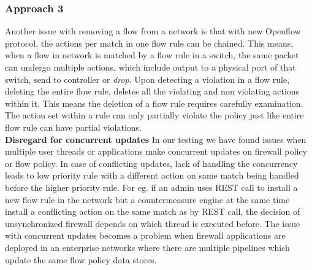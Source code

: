 \subsubsection{Approach 3}
Another issue with removing a flow from a network is that with new Openflow protocol, the actions per match in one flow rule can be chained. This means, when a flow in network is matched by a flow rule in a switch, the same packet can undergo multiple actions, which include output to a physical port of that switch, send to controller or \textit{drop}. Upon detecting a violation in a flow rule, deleting the entire flow rule, deletes all the violating and non violating actions within it. This means the deletion of a flow rule requires carefully examination. The action set within a rule can only partially violate the policy just like entire flow rule can have partial violations.\\
\textbf{Disregard for concurrent updates}
In our testing we have found issues when multiple user threads or applications make concurrent updates on firewall policy or flow policy. In case of conflicting updates, lack of handling the concurrency leads to low priority rule with a different action on same match being handled before the higher priority rule. For eg. if an admin uses REST call to install a new flow rule in the network but a countermeasure engine at the same time install a conflicting action on the same match as by REST call, the decision of unsynchronized firewall depends on which thread is executed before. The issue with concurrent updates becomes a problem when firewall applications are deployed in an enterprise networks where there are multiple pipelines which update the same flow policy data stores.
